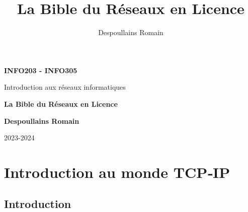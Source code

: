 \documentclass[12pt]{article}
\title{La Bible du Réseaux en Licence}
\author{Despoullains Romain}
\date{}
\begin{document}
\begin{titlepage}
	\begin{center}
		\vspace*{1cm}
		
		\textbf{\LARGE INFO203 - INFO305}
		
		\vspace{0.5cm}
		{\Large Introduction aux réseaux informatiques}
		
		\vspace{2cm}
		
        
		\vspace{2cm}
		
		{\Huge \textbf{La Bible du Réseaux en Licence}}
		
		\vspace{1cm}
		
		{\Large \textbf{Despoullains Romain}}
		
		\vfill
		
		{\Large 2023-2024}
		
	\end{center}
\end{titlepage}

\tableofcontents
\pagebreak

\section{Introduction au monde TCP‐IP}

\subsection{Introduction}
\end{document}
